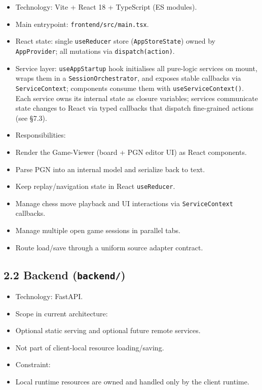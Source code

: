 \documentclass[]{article}
\providecommand{\tightlist}{%
  \setlength{\itemsep}{0pt}\setlength{\parskip}{0pt}}
\begin{document}
\begin{itemize}
\tightlist
\item
  Technology: Vite + React 18 + TypeScript (ES modules).
\item
  Main entrypoint: \texttt{frontend/src/main.tsx}.
\item
  React state: single \texttt{useReducer} store (\texttt{AppStoreState})
  owned by \texttt{AppProvider}; all mutations via
  \texttt{dispatch(action)}.
\item
  Service layer: \texttt{useAppStartup} hook initialises all pure-logic
  services on mount, wraps them in a \texttt{SessionOrchestrator}, and
  exposes stable callbacks via \texttt{ServiceContext}; components
  consume them with \texttt{useServiceContext()}. Each service owns its
  internal state as closure variables; services communicate state
  changes to React via typed callbacks that dispatch fine-grained
  actions (see §7.3).
\item
  Responsibilities:
\item
  Render the Game-Viewer (board + PGN editor UI) as React components.
\item
  Parse PGN into an internal model and serialize back to text.
\item
  Keep replay/navigation state in React \texttt{useReducer}.
\item
  Manage chess move playback and UI interactions via
  \texttt{ServiceContext} callbacks.
\item
  Manage multiple open game sessions in parallel tabs.
\item
  Route load/save through a uniform source adapter contract.
\end{itemize}

\subsection{\texorpdfstring{2.2 Backend
(\texttt{backend/})}{2.2 Backend (backend/)}}\label{backend-backend}

\begin{itemize}
\tightlist
\item
  Technology: FastAPI.
\item
  Scope in current architecture:
\item
  Optional static serving and optional future remote services.
\item
  Not part of client-local resource loading/saving.
\item
  Constraint:
\item
  Local runtime resources are owned and handled only by the client
  runtime.
\end{itemize}
\end{document}
